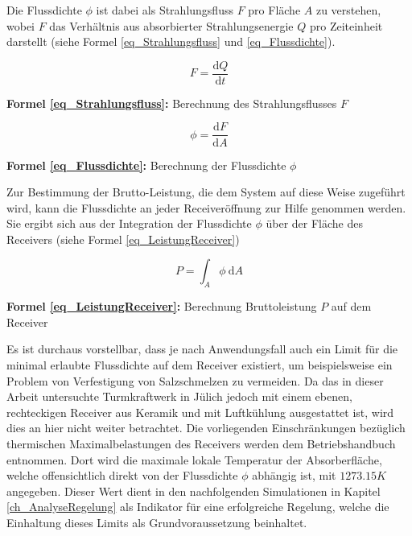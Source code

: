 Die Flussdichte $\phi$ ist dabei als Strahlungsfluss $F$ pro Fläche $A$ zu verstehen, wobei $F$ das Verhältnis aus absorbierter Strahlungsenergie $Q$ pro Zeiteinheit darstellt (siehe Formel \ref{eq_Strahlungsfluss} und \ref{eq_Flussdichte}).

\begin{equation} \label{eq_Strahlungsfluss}
    F = \frac{\text{d}Q}{\text{d} t}
\end{equation}
\centerline{\small{\textsf{\textbf{Formel \ref{eq_Strahlungsfluss}:}} Berechnung des Strahlungsflusses $F$}}

\begin{equation} \label{eq_Flussdichte}
    \phi = \frac{\text{d}F}{\text{d} A}
\end{equation}
\centerline{\small{\textsf{\textbf{Formel \ref{eq_Flussdichte}:}} Berechnung der Flussdichte $\phi$}}

Zur Bestimmung der Brutto-Leistung, die dem System auf diese Weise zugeführt wird, kann die Flussdichte an jeder Receiveröffnung zur Hilfe genommen werden.
Sie ergibt sich aus der Integration der Flussdichte $\phi$ über der Fläche des Receivers (siehe Formel \ref{eq_LeistungReceiver})

\begin{equation} \label{eq_LeistungReceiver}
    P = \int_{A}\phi~\text{d} A
\end{equation}
\centerline{\small{\textsf{\textbf{Formel \ref{eq_LeistungReceiver}:}} Berechnung Bruttoleistung $P$ auf dem Receiver}}

Es ist durchaus vorstellbar, dass je nach Anwendungsfall auch ein Limit für die minimal erlaubte Flussdichte auf dem Receiver existiert, um beispielsweise ein Problem von Verfestigung von Salzschmelzen zu vermeiden.
Da das in dieser Arbeit untersuchte Turmkraftwerk in Jülich jedoch mit einem ebenen, rechteckigen Receiver aus Keramik und mit Luftkühlung ausgestattet ist, wird dies an hier nicht weiter betrachtet.
Die vorliegenden Einschränkungen bezüglich thermischen Maximalbelastungen des Receivers werden dem Betriebshandbuch entnommen.
Dort wird die maximale lokale Temperatur der Absorberfläche, welche offensichtlich direkt von der Flussdichte $\phi$ abhängig ist, mit $1273.15K$ angegeben. Dieser Wert dient in den nachfolgenden Simulationen in Kapitel \ref{ch_AnalyseRegelung} als Indikator für eine erfolgreiche Regelung, welche die Einhaltung dieses Limits als Grundvoraussetzung beinhaltet.

